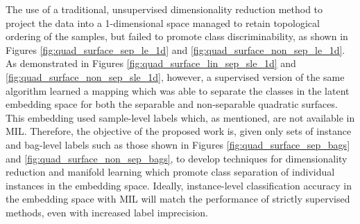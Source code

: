 The use of a traditional, unsupervised dimensionality reduction method to project the data into a 1-dimensional space managed to retain  topological ordering of the samples, but failed to promote class discriminability, as shown in Figures \ref{fig:quad_surface_sep_le_1d} and \ref{fig:quad_surface_non_sep_le_1d}.  As demonstrated in Figures \ref{fig:quad_surface_lin_sep_sle_1d} and \ref{fig:quad_surface_non_sep_sle_1d}, however, a supervised version of the same algorithm learned a mapping which was able to separate the classes in the latent embedding space for both the separable and non-separable quadratic surfaces.  This embedding used sample-level labels which, as mentioned, are not available in MIL.  Therefore,  the objective of the proposed work is, given only sets of instance and bag-level labels such as those shown in Figures \ref{fig:quad_surface_sep_bags} and \ref{fig:quad_surface_non_sep_bags}, to develop techniques for dimensionality reduction and manifold learning which promote class separation of individual instances in the embedding space.  Ideally, instance-level classification accuracy in the embedding space with MIL will match the performance of strictly supervised methods, even with increased label imprecision. 

